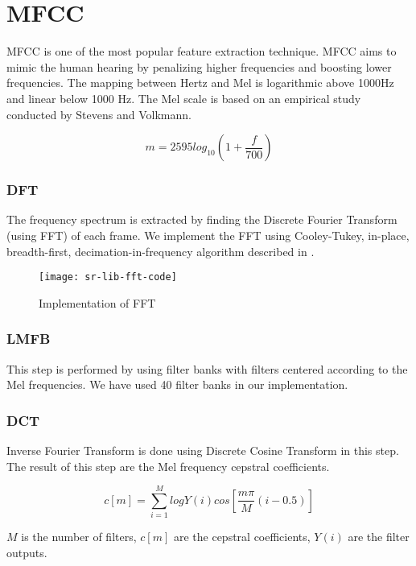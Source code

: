 \section{MFCC}

MFCC is one of the most popular feature extraction technique. MFCC aims to mimic the human hearing by penalizing higher frequencies and boosting lower frequencies. The mapping between Hertz and Mel is logarithmic above 1000Hz and linear below 1000 Hz. The Mel scale is based on an empirical study conducted by Stevens and Volkmann.

\begin{equation*} m = 2595 log_10 (1 + \frac{f}{700}) \end{equation*}

\subsubsection{DFT}
The frequency spectrum is extracted by finding the Discrete Fourier Transform (using FFT) of each frame. We implement the FFT using Cooley-Tukey, in-place, breadth-first, decimation-in-frequency algorithm described in \cite{Blahut:1985:FAD:537283}.

\begin{figure}[h!]
    \centering
    \texttt{[image: sr-lib-fft-code]}
    \label{fig:sr-lib-fft-code}
    \caption{Implementation of FFT}
\end{figure}

\subsubsection{LMFB}
This step is performed by using filter banks with filters centered according to the Mel frequencies.  We have used 40 filter banks in our implementation.

\subsubsection{DCT}

Inverse Fourier Transform is done using Discrete Cosine Transform in this step. The result of this step are the Mel frequency cepstral coefficients.

\begin{equation*}
    c[m] = \sum_{i=1}^M logY(i)cos[\frac{m\pi}{M}(i - 0.5)]
\end{equation*}

$M$ is the number of filters, $c[m]$ are the cepstral coefficients, $Y(i)$ are the filter outputs.

